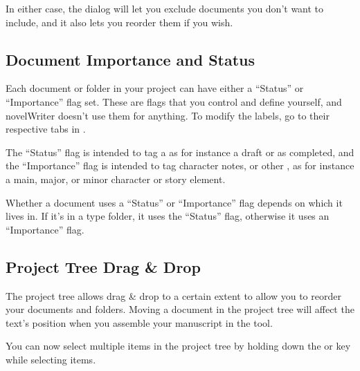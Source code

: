 \documentclass[a4paper,11pt,english]{sphinxmanual}
\begin{document}
\sphinxAtStartPar
In either case, the  dialog will let you exclude documents you don’t want to
include, and it also lets you reorder them if you wish.


\subsection{Document Importance and Status}
\label{\detokenize{usage_project:document-importance-and-status}}\label{\detokenize{usage_project:a-ui-tree-status}}
\sphinxAtStartPar
Each document or folder in your project can have either a “Status” or “Importance” flag set. These
are flags that you control and define yourself, and novelWriter doesn’t use them for anything. To
modify the labels, go to their respective tabs in .

\sphinxAtStartPar
The “Status” flag is intended to tag a {\hyperref[\detokenize{int_glossary:term-Novel-Documents}]{}} as for instance a
draft or as completed, and the “Importance” flag is intended to tag character notes, or other
{\hyperref[\detokenize{int_glossary:term-Project-Notes}]{}}, as for instance a main, major, or minor character or story element.

\sphinxAtStartPar
Whether a document uses a “Status” or “Importance” flag depends on which {\hyperref[\detokenize{int_glossary:term-Root-Folder}]{}} it
lives in. If it’s in a  type folder, it uses the “Status” flag, otherwise it uses an
“Importance” flag.


\subsection{Project Tree Drag \& Drop}
\label{\detokenize{usage_project:project-tree-drag-drop}}\label{\detokenize{usage_project:a-ui-tree-dnd}}
\sphinxAtStartPar
The project tree allows drag \& drop to a certain extent to allow you to reorder your documents and
folders. Moving a document in the project tree will affect the text’s position when you assemble
your manuscript in the  tool.

\sphinxAtStartPar
{}You can now select multiple items in the project tree by holding down the  or
 key while selecting items.
\end{document}

